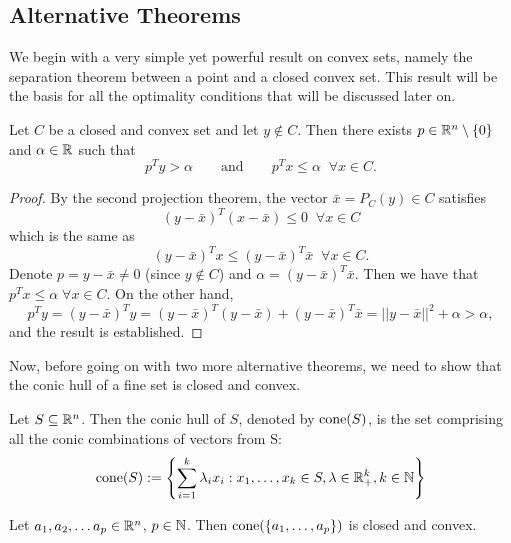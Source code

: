 \documentclass[10pt,a4paper]{article}
\begin{document}
\subsection{Alternative Theorems}
We begin with a very simple yet powerful result on convex sets, namely the separation theorem between a point and a closed convex set. This result will be the basis for all the optimality conditions that will be discussed later on.
\begin{theorem}\label{thm:separation}
	Let $C$ be a closed and convex set and let $y\not \in C$. Then there exists $p\in \mathbb{R}^n \setminus \{0\}$ and $\alpha\in \mathbb{R}$ such that
	\begin{equation*}
		p^Ty>\alpha \qquad \text{and} \qquad p^Tx\leq \alpha \;\;\forall x\in C.
	\end{equation*}
\end{theorem}
\begin{proof}
By the second projection theorem, the vector $\bar{x}=P_C(y)\in C$ satisfies
\begin{equation*}
	(y-\bar{x})^T(x-\bar{x}) \leq 0 \;\; \forall x\in C
\end{equation*}
which is the same as 
\begin{equation*}
	(y-\bar{x})^T x \leq (y-\bar{x})^T \bar{x} \;\; \forall x\in C.
\end{equation*}
Denote $p=y-\bar{x}\neq 0$ (since $y\not \in C$) and $\alpha= (y-\bar{x})^T \bar{x}$. Then we have that $p^Tx\leq \alpha\;\forall x\in C$. On the other hand,
\begin{equation*}
	p^Ty = (y-\bar{x})^Ty = (y-\bar{x})^T(y-\bar{x}) + (y-\bar{x})^T\bar{x} = ||y-\bar{x}||^2 + \alpha > \alpha,
\end{equation*}
and the result is established.
\end{proof}
\noindent Now, before going on with two more alternative theorems, we need to show that the conic hull of a fine set is closed and convex.
\begin{definition} Let $S\subseteq \mathbb{R}^n$. Then the conic hull of $S$, denoted by $\mathord{\mathrm{cone}}(S)$,
	is the set comprising all the conic combinations of vectors from S:
	\begin{equation*}
		\mathord{\mathrm{cone}}(S):=\left\{\sum_{i=1}^k \lambda_i x_i: x_1,\dots, x_k\in S, \lambda\in \mathbb{R}^k_+, k \in \mathbb{N}\right\}
	\end{equation*}
\end{definition}
\begin{lemma}\label{lemma:cone}
	Let $a_1, a_2, \dots a_p\in \mathbb{R}^n$, $p\in \mathbb{N}$. Then $\mathord{\mathrm{cone}}(\{a_1, \dots, a_p\})$ is closed and convex.
\end{lemma}
\end{document}
